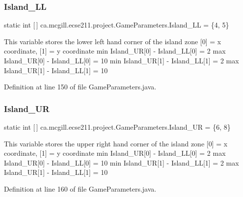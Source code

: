 \subsubsection{\texorpdfstring{Island\+\_\+\+LL}{Island\_LL}}
{\footnotesize\ttfamily  static  int \mbox{[}$\,$\mbox{]} ca.\+mcgill.\+ecse211.\+project.\+Game\+Parameters.\+Island\+\_\+\+LL = \{4, 5\}\hspace{0.3cm}{\ttfamily [static]}}

This variable stores the lower left hand corner of the island zone \mbox{[}0\mbox{]} = x coordinate, \mbox{[}1\mbox{]} = y coordinate min Island\+\_\+\+UR\mbox{[}0\mbox{]} -\/ Island\+\_\+\+LL\mbox{[}0\mbox{]} = 2 max Island\+\_\+\+UR\mbox{[}0\mbox{]} -\/ Island\+\_\+\+LL\mbox{[}0\mbox{]} = 10 min Island\+\_\+\+UR\mbox{[}1\mbox{]} -\/ Island\+\_\+\+LL\mbox{[}1\mbox{]} = 2 max Island\+\_\+\+UR\mbox{[}1\mbox{]} -\/ Island\+\_\+\+LL\mbox{[}1\mbox{]} = 10 

Definition at line 150 of file Game\+Parameters.\+java.

\mbox{\label{enumca_1_1mcgill_1_1ecse211_1_1project_1_1_game_parameters_ac442a5d4a39d6ffae29a183eca5934d3}} 
\subsubsection{\texorpdfstring{Island\+\_\+\+UR}{Island\_UR}}
{\footnotesize\ttfamily  static  int \mbox{[}$\,$\mbox{]} ca.\+mcgill.\+ecse211.\+project.\+Game\+Parameters.\+Island\+\_\+\+UR = \{6, 8\}\hspace{0.3cm}{\ttfamily [static]}}

This variable stores the upper right hand corner of the island zone \mbox{[}0\mbox{]} = x coordinate, \mbox{[}1\mbox{]} = y coordinate min Island\+\_\+\+UR\mbox{[}0\mbox{]} -\/ Island\+\_\+\+LL\mbox{[}0\mbox{]} = 2 max Island\+\_\+\+UR\mbox{[}0\mbox{]} -\/ Island\+\_\+\+LL\mbox{[}0\mbox{]} = 10 min Island\+\_\+\+UR\mbox{[}1\mbox{]} -\/ Island\+\_\+\+LL\mbox{[}1\mbox{]} = 2 max Island\+\_\+\+UR\mbox{[}1\mbox{]} -\/ Island\+\_\+\+LL\mbox{[}1\mbox{]} = 10 

Definition at line 160 of file Game\+Parameters.\+java.

